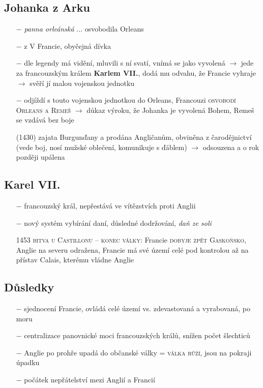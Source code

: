 \documentclass{article}
\begin{document}
\subsection*{Johanka z Arku}
\begin{itemize}
    \vspace{-0.5em}
    \setlength\itemsep{0.15em}
    \item[$-$] \textit{panna orleánská} $\dots$ osvobodila Orleans
    \item[$-$] z V Francie, obyčejná dívka
    \item[$-$] dle legendy má vidění, mluvili s ní svatí, vnímá se jako vyvolená $\rightarrow$ jede za francouzským králem \textbf{Karlem VII.}, dodá mu odvahu, že Francie vyhraje $\rightarrow$ svěří jí malou vojenskou jednotku
    \item[$-$] odjíždí s touto vojenskou jednotkou do Orleans, Francouzi \textsc{osvobodí Orleans a Remeš} $\rightarrow$ důkaz výroku, že Johanka je vyvolená Bohem, Remeš se vzdává bez boje
    \item[(1430)] zajata Burgunďany a prodána Angličanům, obviněna z čarodějnictví (vede boj, nosí mužské oblečení, komunikuje s ďáblem) $\rightarrow$ odsouzena a o rok později upálena
\end{itemize}

\subsection*{Karel VII.}
\begin{itemize}
    \vspace{-0.5em}
    \setlength\itemsep{0.15em}
    \item[$-$] francouzský král, nepřestává ve vítězstvích proti Anglii
    \item[$-$] nový systém vybírání daní, důsledné dodržování, \textit{daň ze soli}
    \item[1453] \textsc{bitva u Castillonu} -- \textsc{konec války}: Francie \textsc{dobyje zpět Gaskoňsko}, Anglie na severu odražena, Francie má své území celé pod kontrolou až na přístav Calais, kterému vládne Anglie
\end{itemize}

\subsection*{Důsledky}
\begin{itemize}
    \vspace{-0.5em}
    \setlength\itemsep{0.15em}
    \item[$-$] sjednocení Francie, ovládá celé území vs. zdevastovaná a vyrabovaná, po moru
    \item[$-$] centralizace panovnické moci francouzských králů, snížen počet šlechticů
    \item[$-$] Anglie po prohře upadá do občanské války = \textsc{válka růží}, jsou na pokraji úpadku
    \item[$-$] počátek nepřátelství mezi Anglií a Francií
\end{itemize}
\end{document}
